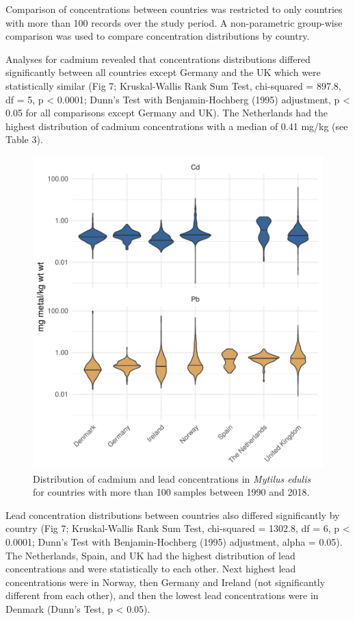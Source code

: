\documentclass[
  12pt,
]{article}
\begin{document}
Comparison of concentrations between countries was restricted to only
countries with more than 100 records over the study period. A
non-parametric group-wise comparison was used to compare concentration
distributions by country.

Analyses for cadmium revealed that concentrations distributions differed
significantly between all countries except Germany and the UK which were
statistically similar (Fig 7; Kruskal-Wallis Rank Sum Test, chi-squared
= 897.8, df = 5, p \textless{} 0.0001; Dunn's Test with
Benjamin-Hochberg (1995) adjustment, p \textless{} 0.05 for all
comparisons except Germany and UK). The Netherlands had the highest
distribution of cadmium concentrations with a median of 0.41 mg/kg (see
Table 3).

\begin{figure}
\centering
\includegraphics{McCrory_ENV972_Project_files/figure-latex/unnamed-chunk-8-1.pdf}
\caption{Distribution of cadmium and lead concentrations in
\emph{Mytilus edulis} for countries with more than 100 samples between
1990 and 2018.}
\end{figure}

Lead concentration distributions between countries also differed
significantly by country (Fig 7; Kruskal-Wallis Rank Sum Test,
chi-squared = 1302.8, df = 6, p \textless{} 0.0001; Dunn's Test with
Benjamin-Hochberg (1995) adjustment, alpha = 0.05). The Netherlands,
Spain, and UK had the highest distribution of lead concentrations and
were statistically to each other. Next highest lead concentrations were
in Norway, then Germany and Ireland (not significantly different from
each other), and then the lowest lead concentrations were in Denmark
(Dunn's Test, p \textless{} 0.05).
\end{document}

